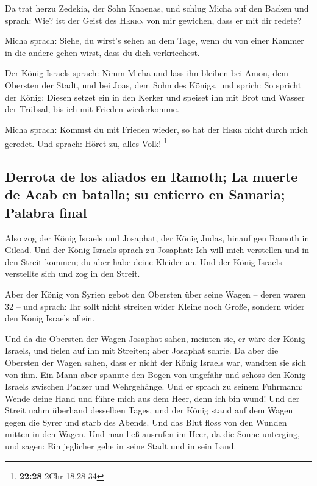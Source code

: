  Da trat herzu Zedekia, der Sohn Knaenas, und schlug
Micha auf den Backen und sprach: Wie? ist der Geist des \textsc{Herrn}
von mir gewichen, dass er mit dir redete?

 Micha sprach: Siehe, du wirst's sehen an dem Tage, wenn
du von einer Kammer in die andere gehen wirst, dass du dich
verkriechest.

 Der König Israels sprach: Nimm Micha und lass ihn
bleiben bei Amon, dem Obersten der Stadt, und bei Joas, dem Sohn des
Königs,  und sprich: So spricht der König: Diesen setzet
ein in den Kerker und speiset ihn mit Brot und Wasser der Trübsal, bis
ich mit Frieden wiederkomme.

 Micha sprach: Kommst du mit Frieden wieder, so hat der
\textsc{Herr} nicht durch mich geredet. Und sprach: Höret zu, alles
Volk! \footnote{\textbf{22:28} 2Chr 18,28-34}

\hypertarget{derrota-de-los-aliados-en-ramoth-la-muerte-de-acab-en-batalla-su-entierro-en-samaria-palabra-final}{%
\subsection{Derrota de los aliados en Ramoth; La muerte de Acab en
batalla; su entierro en Samaria; Palabra
final}\label{derrota-de-los-aliados-en-ramoth-la-muerte-de-acab-en-batalla-su-entierro-en-samaria-palabra-final}}

 Also zog der König Israels und Josaphat, der König
Judas, hinauf gen Ramoth in Gilead.  Und der König
Israels sprach zu Josaphat: Ich will mich verstellen und in den Streit
kommen; du aber habe deine Kleider an. Und der König Israels verstellte
sich und zog in den Streit.

 Aber der König von Syrien gebot den Obersten über seine
Wagen -- deren waren 32 -- und sprach: Ihr sollt nicht streiten wider
Kleine noch Große, sondern wider den König Israels allein.

 Und da die Obersten der Wagen Josaphat sahen, meinten
sie, er wäre der König Israels, und fielen auf ihn mit Streiten; aber
Josaphat schrie.  Da aber die Obersten der Wagen sahen,
dass er nicht der König Israels war, wandten sie sich von ihm.
 Ein Mann aber spannte den Bogen von ungefähr und schoss
den König Israels zwischen Panzer und Wehrgehänge. Und er sprach zu
seinem Fuhrmann: Wende deine Hand und führe mich aus dem Heer, denn ich
bin wund!  Und der Streit nahm überhand desselben Tages,
und der König stand auf dem Wagen gegen die Syrer und starb des Abends.
Und das Blut floss von den Wunden mitten in den Wagen. 
Und man ließ ausrufen im Heer, da die Sonne unterging, und sagen: Ein
jeglicher gehe in seine Stadt und in sein Land.

